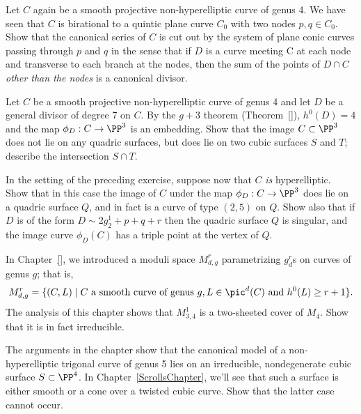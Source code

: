 \begin{exercise}\label{ex7.2}
Let $C$ again be a smooth projective non-hyperelliptic curve of genus 4. We have seen that $C$ is birational to a quintic plane curve $C_0$ with two nodes $p, q \in C_0$. Show that the canonical series of $C$ is cut out by the system of plane conic curves passing through $p$ and $q$ in the sense
that if $D$ is a curve meeting C at each node and transverse to each branch at the nodes, then
the sum of the points of $D\cap C$ \emph{other than the nodes} is a canonical divisor.
\end{exercise}

\begin{exercise}\label{ex7.3}
Let $C$  be a smooth projective non-hyperelliptic curve of genus 4 and let $D$ be a general divisor of degree 7 on $C$. By the $g+3$ theorem (Theorem~\ref{}), $h^0(D) = 4$ and the map $\phi_D : C \to \PP^3$ is an embedding. Show that the image $C \subset \PP^3$ does not lie on any quadric surfaces, but does lie on two cubic surfaces $S$ and $T$; describe the intersection $S \cap T$.
\end{exercise}

\begin{exercise}\label{ex7.4}
In the setting of the preceding exercise, suppose now that $C$ \emph{is} hyperelliptic. Show that in this case the image of $C$ under the map $\phi_D : C \to \PP^3$ does lie on a quadric surface $Q$, and in fact is a curve of type $(2,5)$ on $Q$. Show also that if $D$ is of the form $D \sim 2g^1_2 + p + q + r$ then the quadric surface $Q$ is singular, and the image curve $\phi_D(C)$ has a triple point at the vertex of $Q$.
 \end{exercise}

\begin{exercise}\label{ex7.5}
In Chapter~\ref{}, we introduced a moduli space $M^r_{d,g}$ parametrizing $g^r_d$s on curves of genus $g$; that is,
$$
M^r_{d,g} = \{ (C, L) \mid C \text{ a smooth curve of genus } g, L \in \pic^d(C) \text{ and } h^0(L) \geq r+1 \}.
$$
The analysis of this chapter shows that $M^1_{3,4}$ is a two-sheeted cover of $M_4$. Show that it is in fact irreducible.
\end{exercise}

\begin{exercise}\label{ex7.6}
The arguments in the chapter show that the canonical model of a non-hyperelliptic trigonal curve of genus 5 lies on an irreducible, nondegenerate cubic surface $S \subset \PP^4$. In Chapter~\ref{ScrollsChapter}, we'll see that such a surface is either smooth or a cone over a twisted cubic curve. Show that the latter case cannot occur. 
\end{exercise}

